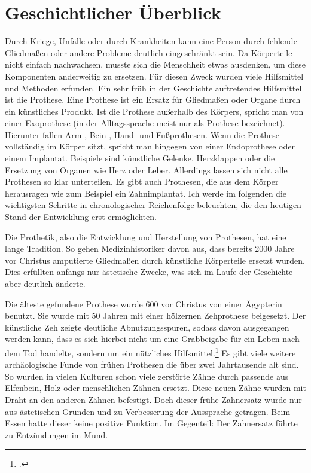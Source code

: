 \section{Geschichtlicher Überblick}
\label{sec:Robin:historical_overview}

Durch Kriege, Unfälle oder durch Krankheiten kann eine Person durch fehlende Gliedmaßen oder andere
Probleme deutlich eingeschränkt sein. Da Körperteile nicht einfach nachwachsen, musste sich die
Menschheit etwas ausdenken, um diese Komponenten anderweitig zu ersetzen. Für diesen Zweck wurden
viele Hilfsmittel und Methoden erfunden. Ein sehr früh in der Geschichte auftretendes Hilfsmittel ist
die Prothese. Eine Prothese ist ein Ersatz für Gliedmaßen oder Organe durch ein künstliches Produkt.
Ist die Prothese außerhalb des Körpers, spricht man von einer Exoprothese (in der Alltagssprache
meist nur als Prothese bezeichnet). Hierunter fallen Arm-, Bein-, Hand- und Fußprothesen. Wenn die
Prothese vollständig im Körper sitzt, spricht man hingegen von einer Endoprothese oder einem
Implantat. Beispiele sind künstliche Gelenke, Herzklappen oder die Ersetzung von Organen wie Herz
oder Leber. Allerdings lassen sich nicht alle Prothesen so klar unterteilen. Es gibt auch Prothesen,
die aus dem Körper herausragen wie zum Beispiel ein Zahnimplantat. Ich werde im folgenden die
wichtigsten Schritte in chronologischer Reichenfolge  beleuchten, die den heutigen Stand der
Entwicklung erst ermöglichten.

Die Prothetik, also die Entwicklung und Herstellung von Prothesen, hat eine lange Tradition. So gehen
Medizinhistoriker davon aus, dass bereits 2000 Jahre vor Christus amputierte Gliedmaßen durch
künstliche Körperteile ersetzt wurden. Dies erfüllten anfangs nur ästetische Zwecke, was sich im
Laufe der Geschichte aber deutlich änderte.

Die älteste gefundene Prothese wurde 600 vor Christus von einer Ägypterin benutzt. Sie wurde mit 50
Jahren mit einer hölzernen Zehprothese beigesetzt. Der künstliche Zeh zeigte deutliche
Abnutzungsspuren, sodass davon ausgegangen werden kann, dass es sich hierbei nicht um eine
Grabbeigabe für ein Leben nach dem Tod handelte, sondern um ein nützliches
Hilfsmittel.\footcite{Lancet:origin_prosthetic} Es gibt viele weitere archäologische Funde von frühen
Prothesen die über zwei Jahrtausende alt sind. So wurden in vielen Kulturen schon viele zerstörte
Zähne durch passende aus Elfenbein, Holz oder menschlichen Zähnen ersetzt. Diese neuen Zähne wurden
mit Draht an den anderen Zähnen befestigt. Doch dieser frühe Zahnersatz wurde nur aus ästetischen
Gründen und zu Verbesserung der Aussprache getragen. Beim Essen hatte dieser keine positive Funktion.
Im Gegenteil: Der Zahnersatz führte zu Entzündungen im Mund.

